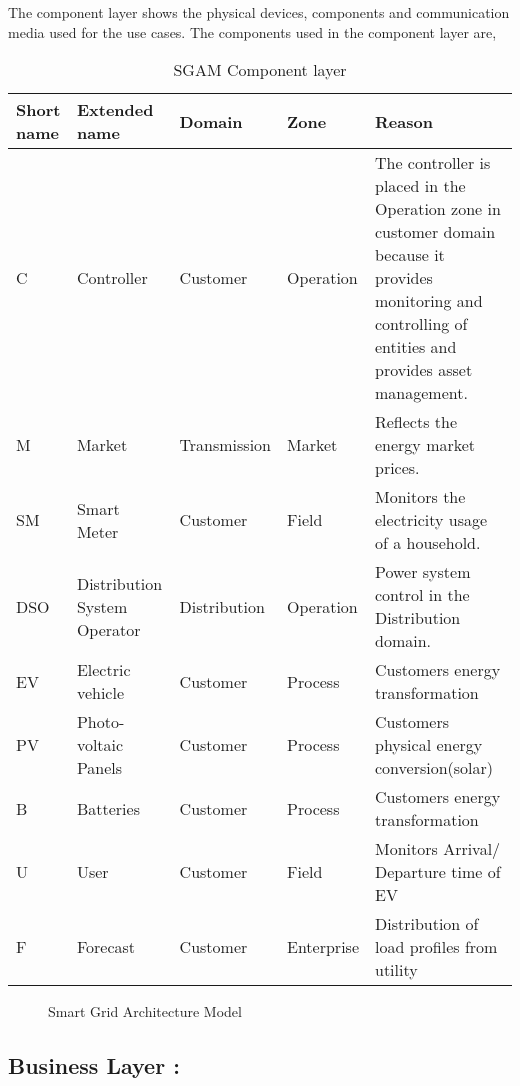 \documentclass{article}
\begin{document}
The component layer shows the physical devices, components and communication media used
for the use cases. The components used in the component layer are,

\begin{table}[h!b]
	\centering
	\begin{tabular} { | p{1cm} | p{2.5cm} | l | l | p{8cm} | }
		\hline
		\textbf{Short name} & \textbf{Extended name} & \textbf{Domain} & \textbf{Zone} & \textbf{Reason} \\ 
		\hline
		C & Controller & Customer & Operation & The controller is placed in the Operation zone in customer domain because it provides monitoring and controlling of entities and provides asset management.\\ 
		\hline
		M & Market & Transmission & Market & Reflects the energy market prices. \\ 
		\hline
		SM & Smart Meter & Customer & Field & Monitors the electricity usage of a household. \\ 
		\hline
		DSO & Distribution System Operator & Distribution & Operation &  Power system control in the Distribution domain. \\ 
		\hline
		EV & Electric vehicle & Customer & Process &  Customers energy transformation \\
		\hline
		PV & Photo-voltaic Panels & Customer & Process & Customers physical energy conversion(solar) \\ 
		\hline
		B & Batteries & Customer & Process & Customers energy transformation  \\
		\hline
		U & User & Customer & Field & Monitors Arrival/ Departure time of EV \\ 
		\hline
		F & Forecast & Customer & Enterprise & Distribution of load profiles from utility \\ 
		\hline
	\end{tabular}
	\caption{SGAM Component layer}
	\label{table:4} 
\end{table}
\begin{figure}[htb]
	\centering
	\caption{Smart Grid Architecture Model }
	\label{fig:Smart Grid Architecture Model }
\end{figure}

\subsection{Business Layer :}
\end{document}
